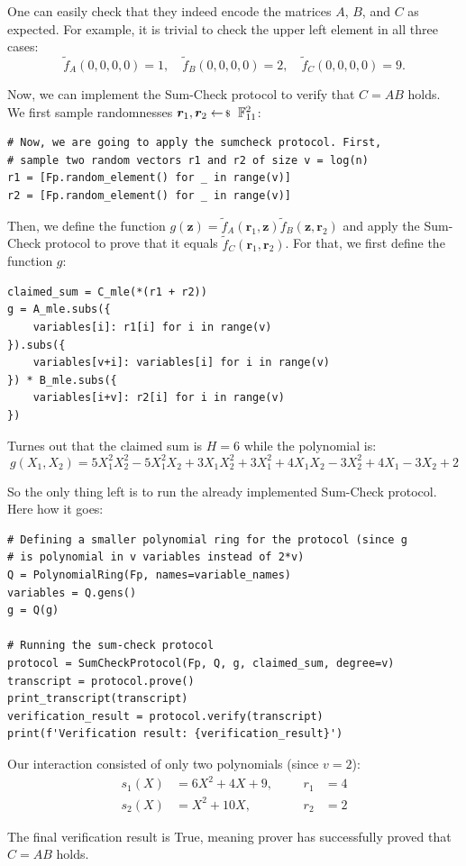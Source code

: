 One can easily check that they indeed encode the matrices $A$, $B$, and $C$ as
expected. For example, it is trivial to check the upper left element in all 
three cases:
\begin{equation*}
    \widetilde{f}_A(0,0,0,0) = 1, \quad \widetilde{f}_B(0,0,0,0) = 2, \quad \widetilde{f}_C(0,0,0,0) = 9.
\end{equation*}

Now, we can implement the Sum-Check protocol to verify that $C = AB$ holds. We
first sample randomnesses $\boldsymbol{r}_1, \boldsymbol{r}_2 \leftarrowS
\mathbb{F}_{11}^2$:
\begin{verbatim}
# Now, we are going to apply the sumcheck protocol. First, 
# sample two random vectors r1 and r2 of size v = log(n)
r1 = [Fp.random_element() for _ in range(v)]
r2 = [Fp.random_element() for _ in range(v)]
\end{verbatim}

Then, we define the function $g(\mathbf{z}) = \widetilde{f}_A(\boldsymbol{r}_1,
\mathbf{z})\widetilde{f}_B(\mathbf{z}, \boldsymbol{r}_2)$ and apply the
Sum-Check protocol to prove that it equals $\widetilde{f}_C(\boldsymbol{r}_1,
\boldsymbol{r}_2)$. For that, we first define the function $g$:
\begin{verbatim}
claimed_sum = C_mle(*(r1 + r2))
g = A_mle.subs({
    variables[i]: r1[i] for i in range(v)
}).subs({
    variables[v+i]: variables[i] for i in range(v)
}) * B_mle.subs({
    variables[i+v]: r2[i] for i in range(v)
})
\end{verbatim}

Turnes out that the claimed sum is $H=6$ while the polynomial is:
\begin{equation*}
    g(X_1,X_2) = 5X_1^2X_2^2 - 5X_1^2X_2 + 3X_1X_2^2 + 3X_1^2 + 4X_1X_2 - 3X_2^2 + 4X_1 - 3X_2 + 2
\end{equation*}

So the only thing left is to run the already implemented Sum-Check protocol.
Here how it goes:
\begin{verbatim}
# Defining a smaller polynomial ring for the protocol (since g 
# is polynomial in v variables instead of 2*v)
Q = PolynomialRing(Fp, names=variable_names)
variables = Q.gens()
g = Q(g)

# Running the sum-check protocol
protocol = SumCheckProtocol(Fp, Q, g, claimed_sum, degree=v)
transcript = protocol.prove()
print_transcript(transcript)
verification_result = protocol.verify(transcript)
print(f'Verification result: {verification_result}')
\end{verbatim}

Our interaction consisted of only two polynomials (since $v=2$):
\begin{align*}
    s_1(X) &= 6X^2 + 4X + 9, &&& r_1 &= 4 \\
    s_2(X) &= X^2 + 10X, &&& r_2 &= 2
\end{align*}

The final verification result is \textsf{True}, meaning prover has successfully
proved that $C = AB$ holds. 
